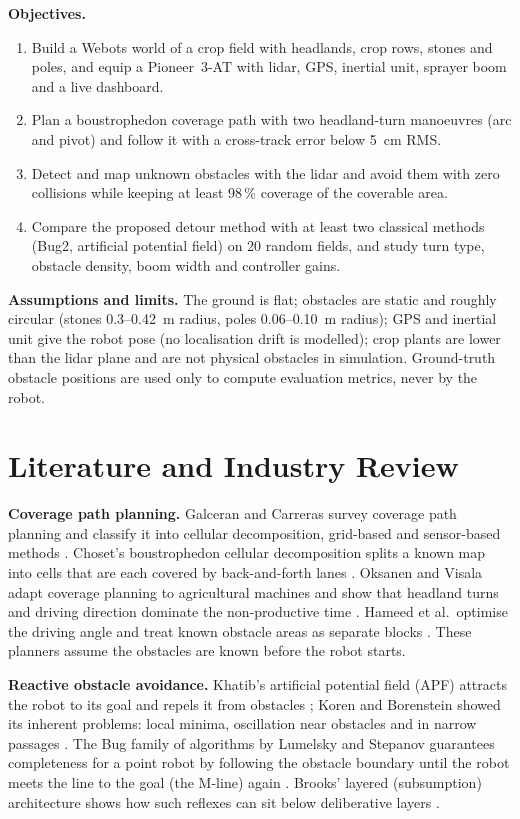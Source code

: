 \documentclass[12pt,a4paper]{article}
\begin{document}
\textbf{Objectives.}
\begin{enumerate}[itemsep=0pt,topsep=2pt]
\item Build a Webots world of a crop field with headlands, crop rows, stones and poles, and equip a Pioneer~3-AT with lidar, GPS, inertial unit, sprayer boom and a live dashboard.
\item Plan a boustrophedon coverage path with two headland-turn manoeuvres (arc and pivot) and follow it with a cross-track error below 5~cm RMS.
\item Detect and map unknown obstacles with the lidar and avoid them with zero collisions while keeping at least 98\,\% coverage of the coverable area.
\item Compare the proposed detour method with at least two classical methods (Bug2, artificial potential field) on 20 random fields, and study turn type, obstacle density, boom width and controller gains.
\end{enumerate}

\textbf{Assumptions and limits.} The ground is flat; obstacles are static and roughly circular (stones 0.3--0.42~m radius, poles 0.06--0.10~m radius); GPS and inertial unit give the robot pose (no localisation drift is modelled); crop plants are lower than the lidar plane and are not physical obstacles in simulation. Ground-truth obstacle positions are used only to compute evaluation metrics, never by the robot.

\section{Literature and Industry Review}
\textbf{Coverage path planning.} Galceran and Carreras survey coverage path planning and classify it into cellular decomposition, grid-based and sensor-based methods \cite{galceran2013}. Choset's boustrophedon cellular decomposition splits a known map into cells that are each covered by back-and-forth lanes \cite{choset2000}. Oksanen and Visala adapt coverage planning to agricultural machines and show that headland turns and driving direction dominate the non-productive time \cite{oksanen2009}. Hameed et al.\ optimise the driving angle and treat known obstacle areas as separate blocks \cite{hameed2013}. These planners assume the obstacles are known before the robot starts.

\textbf{Reactive obstacle avoidance.} Khatib's artificial potential field (APF) attracts the robot to its goal and repels it from obstacles \cite{khatib1986}; Koren and Borenstein showed its inherent problems: local minima, oscillation near obstacles and in narrow passages \cite{koren1991}. The Bug family of algorithms by Lumelsky and Stepanov guarantees completeness for a point robot by following the obstacle boundary until the robot meets the line to the goal (the M-line) again \cite{lumelsky1987}. Brooks' layered (subsumption) architecture shows how such reflexes can sit below deliberative layers \cite{brooks1986}.
\end{document}
